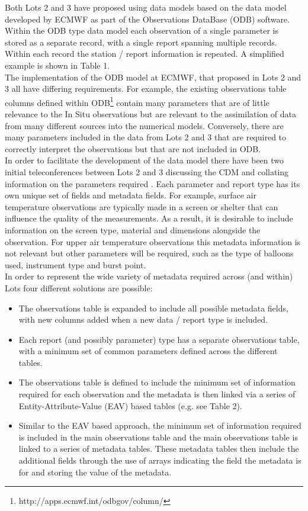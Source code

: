 \documentclass[a4paper]{article}
\begin{document}
Both Lots 2 and 3 have proposed using data models based on the data model developed by ECMWF as part of the Observations DataBase (ODB) software. Within the ODB type data model each observation of a single parameter is stored as a separate record, with a single report spanning multiple records. Within each record the station / report information is repeated. A simplified example is shown in Table 1.\\



The implementation of the ODB model at ECMWF, that proposed in Lots 2 and 3 all have differing requirements. For example, the existing observations table columns defined within ODB\footnote{http://apps.ecmwf.int/odbgov/column/}  contain many parameters that are of little relevance to the In Situ observations but are relevant to the assimilation of data from many different sources into the numerical models. Conversely, there are many parameters included in the data from Lots 2 and 3 that are required to correctly interpret the observations but that are not included in ODB. \\

In order to facilitate the development of the data model there have been two initial teleconferences between Lots 2 and 3 discussing the CDM and collating information on the parameters required . Each parameter and report type has its own unique set of fields and metadata fields. For example, surface air temperature observations are typically made in a screen or shelter that can influence the quality of the measurements. As a result, it is desirable to include information on the screen type, material and dimensions alongside the observation. For upper air temperature observations this metadata information is not relevant but other parameters will be required, such as the type of balloons used, instrument type and burst point.\\

In order to represent the wide variety of metadata required across (and within) Lots four different solutions are possible:\\
\begin{itemize}
\item The observations table is expanded to include all possible metadata fields, with new columns added when a new data / report type is included.
\item Each report (and possibly parameter) type has a separate observations table, with a minimum set of common parameters defined across the different tables.
\item The observations table is defined to include the minimum set of information required for each observation and the metadata is then linked via a series of Entity-Attribute-Value (EAV) based tables (e.g. see Table 2).
\item Similar to the EAV based approach, the minimum set of information required is included in the main observations table and the main observations table is linked to a series of metadata tables. These metadata tables then include the additional fields through the use of arrays indicating the field the metadata is for and storing the value of the metadata.
\end{itemize}
\end{document}
